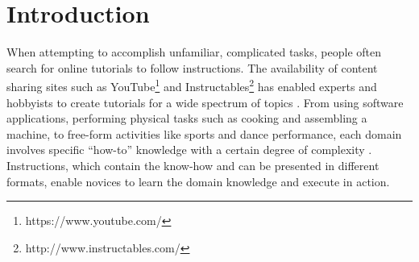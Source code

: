 \chapter{Introduction}



When attempting to accomplish unfamiliar, complicated tasks, people often search for online tutorials to follow instructions. The availability of content sharing sites such as YouTube\footnote{https://www.youtube.com/} and Instructables\footnote{http://www.instructables.com/} has enabled experts and hobbyists to create tutorials for a wide spectrum of topics \cite{Lafreniere:2012tl}. From using software applications, performing physical tasks such as cooking and assembling a machine, to free-form activities like sports and dance performance, each domain involves specific ``how-to'' knowledge with a certain degree of complexity \cite{ryle1945knowhow}. Instructions, which contain the know-how and can be presented in different formats, enable novices to learn the domain knowledge and execute in action.

